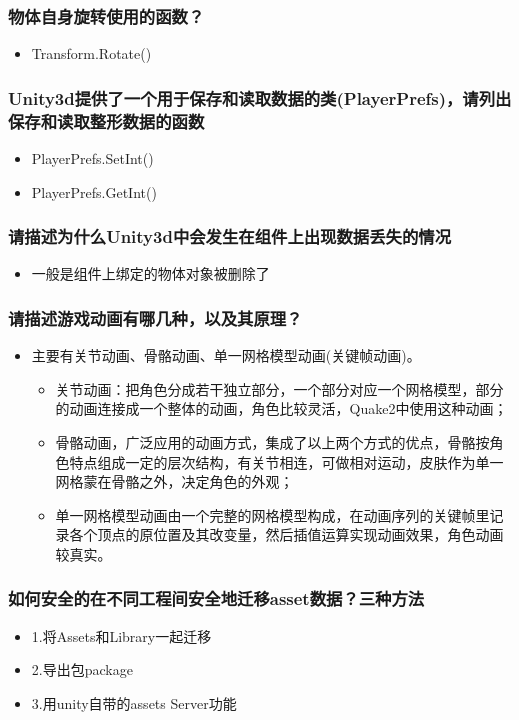 \documentclass[9pt, b5paper]{article}
\begin{document}
\subsubsection{物体自身旋转使用的函数？}
\label{sec:org408d8a6}
\begin{itemize}
\item Transform.Rotate()
\end{itemize}
\subsubsection{Unity3d提供了一个用于保存和读取数据的类(PlayerPrefs)，请列出保存和读取整形数据的函数}
\label{sec:org4efeb75}
\begin{itemize}
\item PlayerPrefs.SetInt()
\item PlayerPrefs.GetInt()
\end{itemize}
\subsubsection{请描述为什么Unity3d中会发生在组件上出现数据丢失的情况}
\label{sec:orgf625b03}
\begin{itemize}
\item 一般是组件上绑定的物体对象被删除了
\end{itemize}
\subsubsection{请描述游戏动画有哪几种，以及其原理？}
\label{sec:orge45eebb}
\begin{itemize}
\item 主要有关节动画、骨骼动画、单一网格模型动画(关键帧动画)。 
\begin{itemize}
\item 关节动画：把角色分成若干独立部分，一个部分对应一个网格模型，部分的动画连接成一个整体的动画，角色比较灵活，Quake2中使用这种动画；
\item 骨骼动画，广泛应用的动画方式，集成了以上两个方式的优点，骨骼按角色特点组成一定的层次结构，有关节相连，可做相对运动，皮肤作为单一网格蒙在骨骼之外，决定角色的外观；
\item 单一网格模型动画由一个完整的网格模型构成，在动画序列的关键帧里记录各个顶点的原位置及其改变量，然后插值运算实现动画效果，角色动画较真实。
\end{itemize}
\end{itemize}
\subsubsection{如何安全的在不同工程间安全地迁移asset数据？三种方法}
\label{sec:orgcb0f79e}
\begin{itemize}
\item 1.将Assets和Library一起迁移
\item 2.导出包package
\item 3.用unity自带的assets Server功能
\end{itemize}
\end{document}
